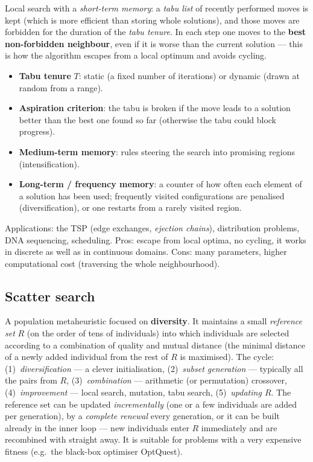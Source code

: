 \documentclass[11pt,a4paper]{article}
\theoremstyle{definition}
\begin{document}
\begin{defbox}
Local search with a \emph{short-term memory}: a \emph{tabu list} of recently
performed moves is kept (which is more efficient than storing whole solutions),
and those moves are forbidden for the duration of the \emph{tabu tenure}. In
each step one moves to the \textbf{best non-forbidden neighbour}, even if it is
worse than the current solution --- this is how the algorithm escapes from a
local optimum and avoids cycling.
\end{defbox}

\begin{itemize}
\item \textbf{Tabu tenure} $T$: static (a fixed number of iterations) or dynamic
  (drawn at random from a range).
\item \textbf{Aspiration criterion}: the tabu is broken if the move leads to a
  solution better than the best one found so far (otherwise the tabu could block
  progress).
\item \textbf{Medium-term memory}: rules steering the search into promising
  regions (intensification).
\item \textbf{Long-term / frequency memory}: a counter of how often each element
  of a solution has been used; frequently visited configurations are penalised
  (diversification), or one restarts from a rarely visited region.
\end{itemize}
Applications: the TSP (edge exchanges, \emph{ejection chains}), distribution
problems, DNA sequencing, scheduling. Pros: escape from local optima, no
cycling, it works in discrete as well as in continuous domains. Cons: many
parameters, higher computational cost (traversing the whole neighbourhood).

\subsection{Scatter search}

A population metaheuristic focused on \textbf{diversity}. It maintains a small
\emph{reference set} $R$ (on the order of tens of individuals) into which
individuals are selected according to a combination of quality and mutual
distance (the minimal distance of a newly added individual from the rest of $R$
is maximised).
The cycle: (1)~\emph{diversification} --- a clever initialisation,
(2)~\emph{subset generation} --- typically all the pairs from $R$,
(3)~\emph{combination} --- arithmetic (or permutation) crossover,
(4)~\emph{improvement} --- local search, mutation, tabu search,
(5)~\emph{updating $R$}. The reference set can be updated
\emph{incrementally} (one or a few individuals are added per generation), by a
\emph{complete renewal} every generation, or it can be built already in the
inner loop --- new individuals enter $R$ immediately and are recombined with
straight away. It is suitable for problems with a very expensive fitness
(e.g.\ the black-box optimiser OptQuest).
\end{document}
